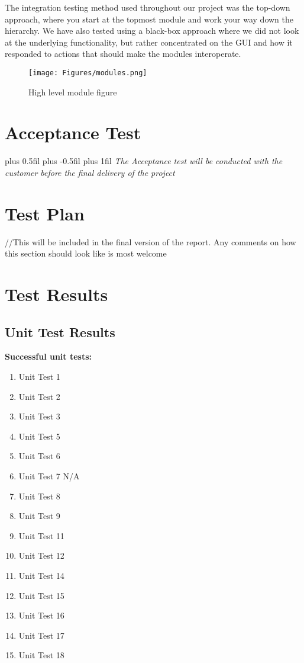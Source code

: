 The integration testing method used throughout our project was the top-down approach, where you start at the topmost module and work your way down the hierarchy. We have also tested using a black-box approach where we did not look at the underlying functionality, but rather concentrated on the GUI and how it responded to actions that should make the modules interoperate.
\begin{figure}[H]
\centering
\texttt{[image: Figures/modules.png]}
\caption{High level module figure}
\label{fig:ModuleFigure}
\end{figure}

\section{Acceptance Test}

\begingroup
\leftskip=0cm plus 0.5fil \rightskip=0cm plus -0.5fil
\parfillskip=0cm plus 1fil
\textit{The Acceptance test will be conducted with the customer before the final delivery of the project}\par
\endgroup

\section{Test Plan}
//This will be included in the final version of the report. Any comments on how this section should look like is most welcome
\section{Test Results}
\subsection{Unit Test Results}
\textbf{Successful unit tests:}

\begin{multicols}{3}
\begin{enumerate}
    \item Unit Test 1
    \item Unit Test 2
    \item Unit Test 3
    \item Unit Test 5
    \item Unit Test 6
    \item Unit Test 7 N/A
    \item Unit Test 8
    \item Unit Test 9
    \item Unit Test 11
    \item Unit Test 12
    \item Unit Test 14
    \item Unit Test 15
    \item Unit Test 16
    \item Unit Test 17
    \item Unit Test 18
\end{enumerate}
\end{multicols}

